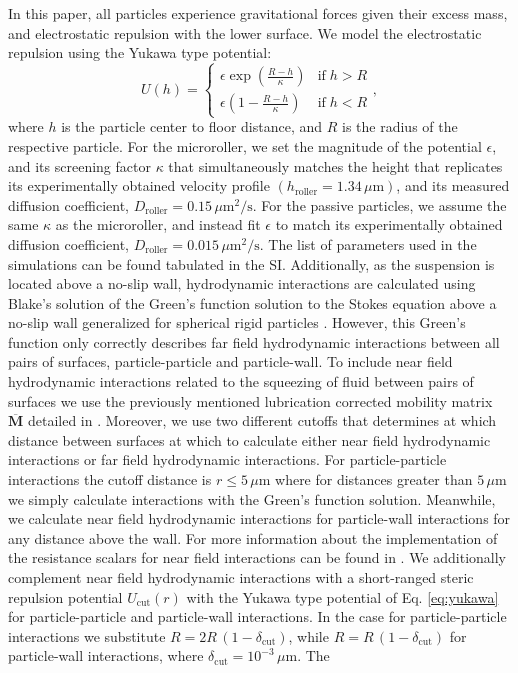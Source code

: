 \documentclass[12pt]{article}
\begin{document}
In this paper, all particles experience gravitational forces given their excess mass, and electrostatic repulsion with the lower surface. We model the electrostatic repulsion using the Yukawa type potential:
\begin{equation}
    U (h) = \begin{cases}
    \epsilon \exp{\left ( \frac{R - h}{\kappa}  \right)} & \text{if}\; h > R\\
    \epsilon \left ( 1 - \frac{R - h}{\kappa} \right ) & \text{if} \; h < R
    \end{cases}
    ,
    \label{eq:yukawa}
\end{equation}
where $h$ is the particle center to floor distance, and $R$ is the radius of the respective particle. For the microroller, we set the magnitude of the potential $\epsilon$, and its screening factor $\kappa$ that simultaneously matches the height that replicates its experimentally obtained velocity profile $\left ( h_\mathrm{roller} = 1.34 \, \mu \mathrm{m} \right )$, and its measured diffusion coefficient, $D_\mathrm{roller} = 0.15 \, \mu \mathrm{m}^2/\mathrm{s}$. For the passive particles, we assume the same $\kappa$ as the microroller, and instead fit $\epsilon$ to match its experimentally obtained diffusion coefficient, $D_\mathrm{roller} = 0.015 \, \mu \mathrm{m}^2/\mathrm{s}$. The list of parameters used in the simulations can be found tabulated in the SI. Additionally, as the suspension is located above a no-slip wall, hydrodynamic interactions are calculated using Blake's solution of the Green's function solution to the Stokes equation above a no-slip wall generalized for spherical rigid particles \cite{Blake1971,Swan_no_slip}. However, this Green's function only correctly describes far field hydrodynamic interactions between all pairs of surfaces, particle-particle and particle-wall. To include near field hydrodynamic interactions related to the squeezing of fluid between pairs of surfaces we use the previously mentioned lubrication corrected mobility matrix $\overline{\mathbf{M}}$ detailed in \cite{sprinkle_driven_2020}. Moreover, we use two different cutoffs that determines at which distance between surfaces at which to calculate either near field hydrodynamic interactions or far field hydrodynamic interactions. For particle-particle interactions the cutoff distance is $r \leq 5 \, \mu \mathrm{m}$ where for distances greater than $5 \, \mu \mathrm{m}$ we simply calculate interactions with the Green's function solution. Meanwhile, we calculate near field hydrodynamic interactions for particle-wall interactions for any distance above the wall. For more information about the implementation of the resistance scalars for near field interactions can be found in \cite{sprinkle_driven_2020}. We additionally complement near field hydrodynamic interactions with a short-ranged steric repulsion potential $U_\mathrm{cut} \left (r \right)$ with the Yukawa type potential of Eq. \ref{eq:yukawa} for particle-particle and particle-wall interactions. In the case for particle-particle interactions we substitute $R = 2R \,(1 - \delta_\mathrm{cut})$, while $R= R \, (1 - \delta_\mathrm{cut})$ for particle-wall interactions, where $\delta_\mathrm{cut} = 10^{-3} \, \mu \mathrm{m}$. The 
\end{document}
